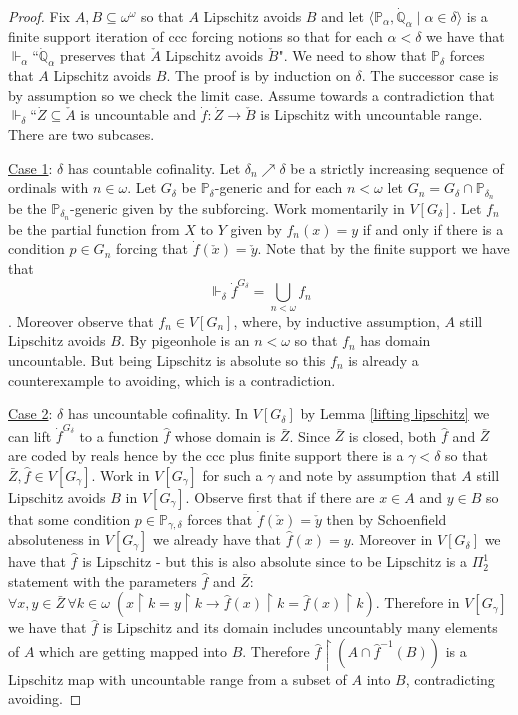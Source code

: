 \documentclass[leqno,11pt]{amsart}
\theoremstyle{definition}
\theoremstyle{remark}
\def\hook{\upharpoonright}
\def\forces{\Vdash}
\def\Q{\mathbb Q}
\def\P{\mathbb P}
\begin{document}
\begin{proof}
    Fix $A, B \subseteq \omega^\omega$ so that $A$ Lipschitz avoids $B$ and let $\langle \P_\alpha , \dot{\Q}_\alpha\; | \; \alpha \in \delta\rangle$ is a finite support iteration of ccc forcing notions so that for each $\alpha < \delta$ we have that $\forces_\alpha$``$\dot{\Q}_\alpha$ preserves that $\check{A}$ Lipschitz avoids $\check{B}$". We need to show that $\P_\delta$ forces that $A$ Lipschitz avoids $B$. The proof is by induction on $\delta$. The successor case is by assumption so we check the limit case. Assume towards a contradiction that $\forces_\delta$``$\dot{Z} \subseteq \check{A}$ is uncountable and $\dot{f}:\dot{Z} \to \check{B}$ is Lipschitz with uncountable range. There are two subcases. 

    \noindent \underline{Case 1}: $\delta$ has countable cofinality. Let $\delta_n \nearrow \delta$ be a strictly increasing sequence of ordinals with $n \in \omega$. Let $G_\delta$ be $\P_\delta$-generic and for each $n < \omega$ let $G_n = G_\delta \cap \P_{\delta_n}$ be the $\P_{\delta_n}$-generic given by the subforcing. Work momentarily in $V[G_\delta]$. Let $f_n$ be the partial function from $X$ to $Y$ given by $f_n(x) = y$ if and only if there is a condition $p \in G_n$ forcing that $\dot{f}(\check{x}) = \check{y}$. Note that by the finite support we have that $$\forces_{\delta} \dot{f}^{G_\delta} =\bigcup_{n < \omega} f_n$$. Moreover observe that $f_n \in V[G_n]$, where, by inductive assumption, $A$ still Lipschitz avoids $B$. By pigeonhole is an $n<\omega$ so that $f_n$ has domain uncountable. But being Lipschitz is absolute so this $f_n$ is already a counterexample to avoiding, which is a contradiction. 

    \noindent \underline{Case 2}: $\delta$ has uncountable cofinality. In $V[G_\delta]$ by Lemma \ref{lifting lipschitz} we can lift $\dot{f}^{G_\delta}$ to a function $\hat{f}$ whose domain is $\bar{Z}$. Since $\bar{Z}$ is closed, both $\hat{f}$ and $\bar{Z}$ are coded by reals hence by the ccc plus finite support there is a $\gamma < \delta$ so that $\bar{Z}, \hat{f} \in V[G_\gamma]$. Work in $V[G_\gamma]$ for such a $\gamma$ and note by assumption that $A$ still Lipschitz avoids $B$ in $V[G_\gamma]$. Observe first that if there are $x \in A$ and $y \in B$ so that some condition $p \in \P_{\gamma, \delta}$ forces that $\dot{f}(\check{x}) = \check{y}$ then by Schoenfield absoluteness in $V[G_\gamma]$ we already have that $\hat{f}(x) = y$. Moreover in $V[G_\delta]$ we have that $\hat{f}$ is Lipschitz - but this is also absolute since to be Lipschitz is a $\Pi^1_2$ statement with the parameters $\hat{f}$ and $\bar{Z}$: $\forall x, y \in \bar{Z} \, \forall k \in \omega\; ( x \hook k = y \hook k \to \hat{f}(x) \hook k = \hat{f} (x) \hook k)$. Therefore in $V[G_\gamma]$ we have that $\hat{f}$ is Lipschitz and its domain includes uncountably many elements of $A$ which are getting mapped into $B$. Therefore $\hat{f}\hook (A \cap \hat{f}^{-1}(B))$ is a Lipschitz map with uncountable range from a subset of $A$ into $B$, contradicting avoiding. 
\end{proof}
\end{document}
